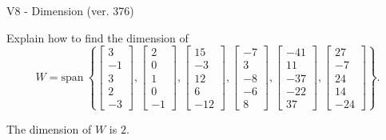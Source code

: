 \begin{exercise}
  \begin{exerciseTitle}V8 - Dimension (ver. 376)\end{exerciseTitle}
  \begin{exerciseStatement}
    Explain how to find the dimension of 
\[W=\mathrm{span}\ \left\{\left[\begin{array}{r}
3 \\
-1 \\
3 \\
2 \\
-3
\end{array}\right] , \left[\begin{array}{r}
2 \\
0 \\
1 \\
0 \\
-1
\end{array}\right] , \left[\begin{array}{r}
15 \\
-3 \\
12 \\
6 \\
-12
\end{array}\right] , \left[\begin{array}{r}
-7 \\
3 \\
-8 \\
-6 \\
8
\end{array}\right] , \left[\begin{array}{r}
-41 \\
11 \\
-37 \\
-22 \\
37
\end{array}\right] , \left[\begin{array}{r}
27 \\
-7 \\
24 \\
14 \\
-24
\end{array}\right]\right\}.\]



  \end{exerciseStatement}
  \begin{exerciseAnswer}
   The dimension of \(W\) is  \(2\).
  


  \end{exerciseAnswer}
\end{exercise}